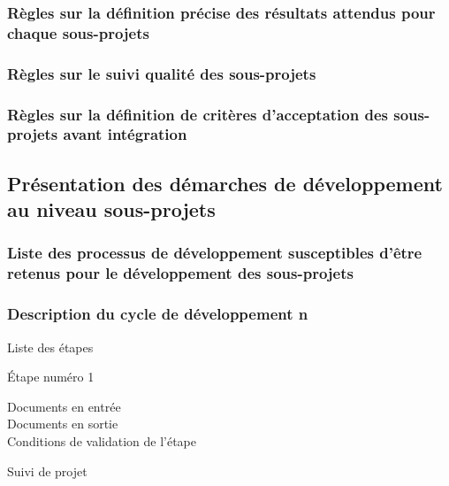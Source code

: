         \subsubsection{Règles sur la définition précise des résultats attendus 
            pour chaque sous-projets}

        \subsubsection{Règles sur le suivi qualité des sous-projets}

        \subsubsection{Règles sur la définition de critères d’acceptation des 
            sous-projets avant intégration}

    \subsection{Présentation des démarches de développement au niveau 
            sous-projets}

        \subsubsection{Liste des processus de développement susceptibles d’être 
            retenus pour le développement des sous-projets}

        \subsubsection{Description du cycle de développement n}

            \par{Liste des étapes}

            \par{Étape numéro 1}

            \begin{description}
                \item[Documents en entrée]
                \item[Documents en sortie]
                \item[Conditions de validation de l'étape]
            \end{description}

            \par{Suivi de projet}
\pagebreak
